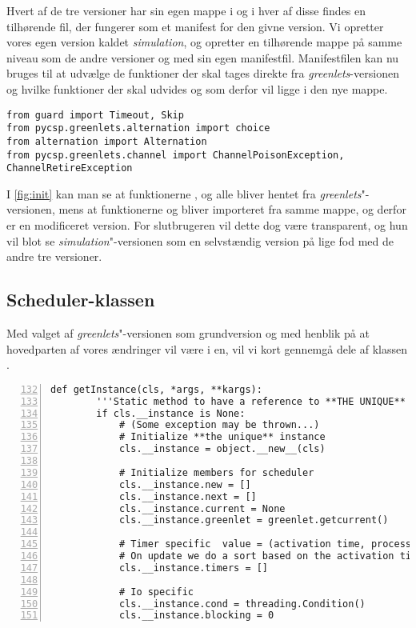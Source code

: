 Hvert af de tre versioner har sin egen mappe i \pycsp og i hver af disse findes en tilhørende  fil, der fungerer som et manifest for den givne version. Vi opretter vores egen version kaldet \emph{simulation}, og opretter en tilhørende mappe på samme niveau som de andre versioner og med sin egen manifestfil. Manifestfilen kan nu bruges til at udvælge de funktioner der skal tages direkte fra \emph{greenlets}-versionen og hvilke funktioner der skal udvides og som derfor vil ligge i den nye mappe.
\begin{lstlisting}[float=hbtp,label=fig:init,caption=Uddrag af \code{\_\_init\_\_.py} for simulationsversionen.]
from guard import Timeout, Skip
from pycsp.greenlets.alternation import choice
from alternation import Alternation
from pycsp.greenlets.channel import ChannelPoisonException, ChannelRetireException
\end{lstlisting}

I \cref{fig:init} kan man se at funktionerne ,  og  alle bliver hentet fra \emph{greenlets}"-versionen, mens at funktionerne  og  bliver importeret fra samme mappe, og derfor er en modificeret version. For slutbrugeren  vil dette dog være transparent, og hun vil blot se \emph{simulation}"-versionen som en selvstændig version på lige fod med de andre tre versioner.

\subsection{Scheduler-klassen}
Med valget af \emph{greenlets}"-versionen som grundversion og med henblik på at hovedparten af vores ændringer vil være i \sched en, vil vi kort gennemgå dele af klassen .

\begin{lstlisting}[firstnumber=132,stepnumber=5,numbers=left, float, label=fig:scheduling, caption=Uddrag af Scheduler.py i \emph{greenlets}versionen.]
    def getInstance(cls, *args, **kargs):
        '''Static method to have a reference to **THE UNIQUE** instance'''
        if cls.__instance is None:
            # (Some exception may be thrown...)
            # Initialize **the unique** instance
            cls.__instance = object.__new__(cls)

            # Initialize members for scheduler
            cls.__instance.new = []
            cls.__instance.next = []
            cls.__instance.current = None
            cls.__instance.greenlet = greenlet.getcurrent()

            # Timer specific  value = (activation time, process)
            # On update we do a sort based on the activation time
            cls.__instance.timers = []

            # Io specific
            cls.__instance.cond = threading.Condition()
            cls.__instance.blocking = 0
\end{lstlisting}

